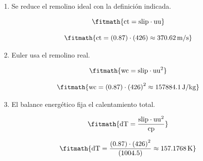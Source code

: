 \begin{enumerate}

\item Se reduce el remolino ideal con la definición indicada.

\[\fitmath{\mathrm{ct}=\mathrm{slip}\cdot \mathrm{uu}}\]

\[\fitmath{\mathrm{ct}=(0.87)\cdot (426)\approx 370.62\,\mathrm{m/s}}\]

\item Euler usa el remolino real.

\[\fitmath{\mathrm{wc}=\mathrm{slip}\cdot {\mathrm{uu}}^{2}}\]

\[\fitmath{\mathrm{wc}=(0.87)\cdot {(426)}^{2}\approx 157884.1\,\mathrm{J/kg}}\]

\item El balance energético fija el calentamiento total.

\[\fitmath{\mathrm{dT}=\frac{\mathrm{slip}\cdot {\mathrm{uu}}^{2}}{\mathrm{cp}}}\]

\[\fitmath{\mathrm{dT}=\frac{(0.87)\cdot {(426)}^{2}}{(1004.5)}\approx 157.1768\,\mathrm{K}}\]

\end{enumerate}
